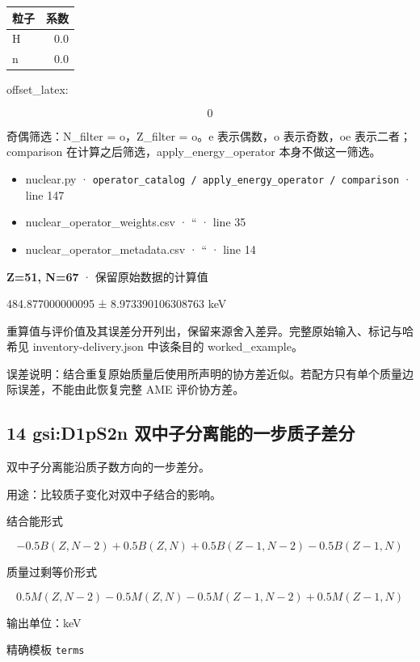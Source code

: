 \documentclass[
  11pt,
  letterpaper,
]{article}
\providecommand{\tightlist}{%
  \setlength{\itemsep}{0pt}\setlength{\parskip}{0pt}}
\begin{document}
\begin{longtable}[]{@{}lr@{}}
\toprule\noalign{}
粒子 & 系数 \\
\midrule\noalign{}
\endhead
\bottomrule\noalign{}
\endlastfoot
H & 0.0 \\
n & 0.0 \\
\end{longtable}

offset\_latex:

\[
0
\]

奇偶筛选：N\_filter = o，Z\_filter = o。e 表示偶数，o 表示奇数，oe
表示二者；comparison 在计算之后筛选，apply\_energy\_operator
本身不做这一筛选。

\begin{itemize}
\tightlist
\item
  nuclear.py ·
  \texttt{operator\_catalog\ /\ apply\_energy\_operator\ /\ comparison}
  · line 147
\item
  nuclear\_operator\_weights.csv · `` · line 35
\item
  nuclear\_operator\_metadata.csv · `` · line 14
\end{itemize}

\textbf{Z=51, N=67} · 保留原始数据的计算值

484.877000000095 ± 8.973390106308763 keV

重算值与评价值及其误差分开列出，保留来源舍入差异。完整原始输入、标记与哈希见
inventory-delivery.json 中该条目的 worked\_example。

误差说明：结合重复原始质量后使用所声明的协方差近似。若配方只有单个质量边际误差，不能由此恢复完整
AME 评价协方差。

\subsection{14 gsi:D1pS2n
双中子分离能的一步质子差分}\label{gsid1ps2n-ux53ccux4e2dux5b50ux5206ux79bbux80fdux7684ux4e00ux6b65ux8d28ux5b50ux5deeux5206}

双中子分离能沿质子数方向的一步差分。

用途：比较质子变化对双中子结合的影响。

结合能形式

\[
-0.5B(Z,N-2)+0.5B(Z,N)+0.5B(Z-1,N-2)-0.5B(Z-1,N)
\]

质量过剩等价形式

\[
0.5M(Z,N-2)-0.5M(Z,N)-0.5M(Z-1,N-2)+0.5M(Z-1,N)
\]

输出单位：keV

精确模板 \texttt{terms}
\end{document}
